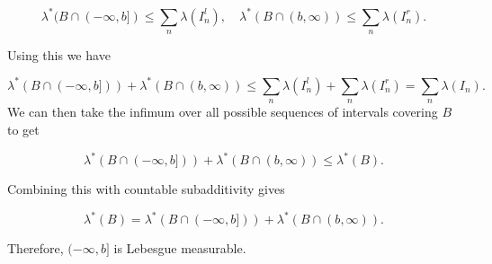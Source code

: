 \documentclass[
]{book}
\theoremstyle{definition}
\theoremstyle{definition}
\theoremstyle{definition}
\theoremstyle{definition}
\theoremstyle{remark}
\begin{document}
\[ \lambda^*(B \cap (-\infty, b]) \leq \sum_n \lambda(I^l_n), \quad \lambda^*(B \cap (b,\infty)) \leq \sum_n \lambda(I^r_n). \]

Using this we have

\[ \lambda^*(B \cap(-\infty,b])) + \lambda^*(B \cap (b,\infty)) \leq \sum_n \lambda(I^l_n) + \sum_n \lambda(I^r_n) = \sum_n \lambda(I_n).\]
We can then take the infimum over all possible sequences of intervals covering \(B\) to get

\[ \lambda^*(B \cap(-\infty,b])) + \lambda^*(B \cap (b,\infty)) \leq \lambda^*(B). \]

Combining this with countable subadditivity gives

\[ \lambda^*(B) = \lambda^*(B \cap(-\infty,b])) + \lambda^*(B \cap (b,\infty)). \]

Therefore, \((-\infty,b]\) is Lebesgue measurable.
\end{document}

